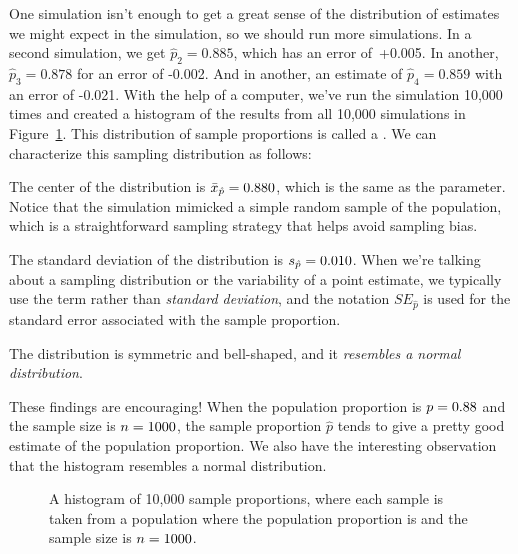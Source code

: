 One simulation isn't enough to get a great sense of the
distribution of estimates we might expect in the simulation,
so we should run more simulations.
In a second simulation,
we get $\hat{p}_2 = 0.885$, which has an error of~+0.005.
In another, $\hat{p}_3 = 0.878$ for an error of -0.002.
And in another,
an estimate of $\hat{p}_4 = 0.859$ with an error of -0.021.
With the help of a computer, we've run the simulation 10,000 times
and created a histogram of the results from all 10,000 simulations
in Figure~\ref{sampling_10k_prop_88p}. This
distribution of sample proportions is called a
.
We can characterize this sampling distribution as follows:
\begin{description}
\setlength{\itemsep}{0mm}
\item[Center.]
    The center of the distribution is
    $\bar{x}_{\hat{p}} = 0.88{}0$,
    which is the same as the parameter.
    Notice that the simulation mimicked a simple random sample
    of the population, which is a straightforward sampling
    strategy that helps avoid sampling bias.
\item[Spread.]
    The standard deviation of the distribution
    is $s_{\hat{p}} = 0.010{}$.
    When we're talking about
    a sampling distribution or the variability of
    a point estimate, we typically use the term
    rather than \emph{standard deviation},
    and the notation $SE_{\hat{p}}$ is used for the standard
    error associated with the sample proportion.
\item[Shape.]
    The distribution is symmetric and bell-shaped,
    and it \emph{resembles a normal distribution}.
\end{description}
These findings are encouraging!
When the population
proportion is $p = 0.88{}$ and the sample size is
$n = 1000{}$,
the sample proportion $\hat{p}$ tends to give
a pretty good estimate
of the population proportion.
We also have the interesting observation
that the histogram resembles a normal distribution.

\begin{figure}[h]
   \centering
   \caption{A histogram of 10,000 sample proportions,
       where each sample is taken from a population
       where the population proportion is
       \pewsolarparprop{} and the sample size
       is $n = 1000{}$.}
   \label{sampling_10k_prop_88p}
\end{figure}

